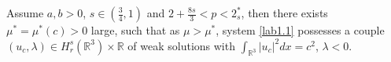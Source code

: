 \begin{theorem}\label{thm1.2}
Assume $a,b>0$, $s\in(\frac{3}{4},1)$ and $2+\frac{8s}{3}<p<2^*_s$, then there exists
$\mu^*=\mu^*(c)>0$ large, such that as $\mu>\mu^*$, system \eqref{lab1.1}
possesses a couple $(u_c, \lambda)\in H^s_r(\mathbb{R}^3)\times \mathbb{R}$ of weak
solutions with $\int_{\mathbb{R}^3}|u_c|^2dx=c^2$, $\lambda<0$.
\end{theorem}
